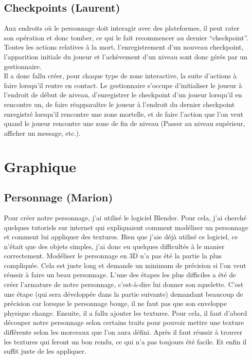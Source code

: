 \documentclass[a4paper , 12pt]{article}
\begin{document}
	\subsection {Checkpoints (Laurent)}

\quad

    Aux endroits où le personnage doit interagir avec des plateformes, il peut rater son opération et donc tomber, ce qui le fait recommencer au dernier “checkpoint”. Toutes les actions relatives à la mort, l’enregistrement d’un nouveau checkpoint, l’apparition initiale du joueur et l’achèvement d’un niveau sont donc gérés par un gestionnaire.\\

Il a donc fallu créer, pour chaque type de zone interactive, la suite d’actions à faire lorsqu’il rentre en contact. Le gestionnaire s’occupe d’initialiser le joueur à l’endroit de début de niveau, d’enregistrer le checkpoint d’un joueur lorsqu’il en rencontre un, de faire réapparaître le joueur à l’endroit du dernier checkpoint enregistré lorsqu’il rencontre une zone mortelle, et de faire l’action que l’on veut quand le joueur rencontre une zone de fin de niveau (Passer au niveau supérieur, afficher un message, etc.).

\quad

\newpage

\section{Graphique}

	\subsection{Personnage (Marion)}

\quad

Pour créer notre personnage, j’ai utilisé le logiciel Blender. Pour cela, j’ai cherché quelques tutoriels sur internet qui expliquaient comment modéliser un personnage et comment lui appliquer des textures. Bien que j’aie déjà utilisé ce logiciel, ce n’était que des objets simples, j’ai donc eu quelques difficultés à le manier correctement. Modéliser le personnage en 3D n’a pas été la partie la plus compliquée. Cela est juste long et demande un minimum de précision si l'on veut réussir à faire un beau personnage. L’une des étapes les plus difficiles a été de créer l’armature de notre personnage, c’est-à-dire lui donner son squelette. C’est une étape (qui sera développée dans la partie suivante) demandant beaucoup de précision car lorsque le personnage bouge, il ne faut pas que son enveloppe physique change. Ensuite, il a fallu ajouter les textures. Pour cela, il faut d’abord découper notre personnage selon certains traits pour pouvoir mettre une texture différente selon les morceaux que l’on aura défini. Après il faut réussir à trouver les textures qui feront un bon rendu, ce qui n’a pas toujours été facile. Et enfin il suffit juste de les appliquer. 
\quad
\end{document}
